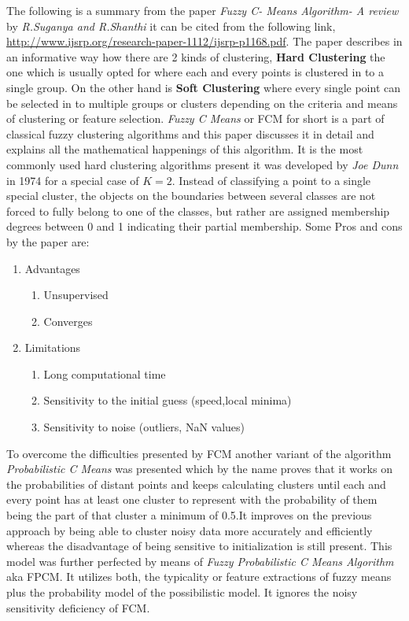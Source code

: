 \documentclass[12pt]{article}
\begin{document}
The following is a summary from the paper \textit{Fuzzy C- Means Algorithm- A review} by \textit{R.Suganya and R.Shanthi} it can be cited from the following link, \url{http://www.ijsrp.org/research-paper-1112/ijsrp-p1168.pdf}.
The paper describes in an informative way how there are 2 kinds of clustering, \textbf{Hard Clustering} the one which is usually opted for where each and every points is clustered in to a single group. On the other hand is \textbf{Soft Clustering} where every single point can be selected in to multiple groups or clusters depending on the criteria and means of clustering or feature selection. \textit{Fuzzy C Means} or FCM for short is a part of classical fuzzy clustering algorithms and this paper discusses it in detail and explains all the mathematical happenings of this algorithm. It is the most commonly used hard clustering algorithms present it was developed by \textit{Joe Dunn} in 1974 for a special case of $ K=2 $. Instead of classifying a point to a single special cluster, the objects on the boundaries between several classes are not forced to fully belong to one of the classes, but rather are assigned membership degrees between 0 and 1 indicating their partial membership.
Some Pros and cons by the paper are:
\begin{enumerate}
	\item Advantages
	\begin{enumerate}
		\item Unsupervised
		\item Converges
	\end{enumerate}
	\item Limitations
	\begin{enumerate}
		\item Long computational time
		\item Sensitivity to the initial guess (speed,local minima)
		\item Sensitivity to noise (outliers, NaN values)
	\end{enumerate}
\end{enumerate}

To overcome the difficulties presented by FCM another variant of the algorithm \textit{Probabilistic C Means} was presented which by the name proves that it works on the probabilities of distant points and keeps calculating clusters until each and every point has at least one cluster to represent with the probability of them being the part of that cluster a minimum of 0.5.It improves on the previous approach by being able to cluster noisy data more accurately and efficiently whereas the disadvantage of being sensitive to initialization is still present. This model was further perfected by means of \textit{Fuzzy Probabilistic C Means Algorithm} aka FPCM. It utilizes both, the typicality or feature extractions of fuzzy means plus the probability model of the possibilistic model. It ignores the noisy sensitivity deficiency of FCM.
\end{document}
